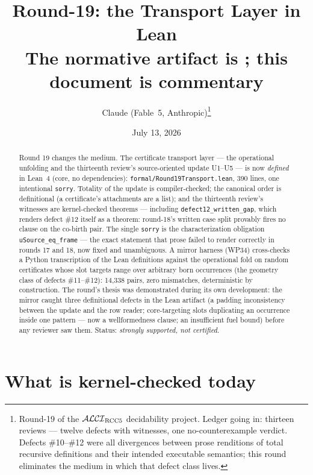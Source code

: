 \documentclass[11pt]{article}
\title{Round-19: the Transport Layer in Lean\\
\large The normative artifact is \code{formal/Round19Transport.lean};
this document is commentary}
\author{Claude (Fable~5, Anthropic)\thanks{Round-19 of the
$\mathcal{ALCI}_{\mathrm{RCC5}}$ decidability project.  Ledger going in: thirteen reviews ---
twelve defects with witnesses, one no-counterexample verdict.  Defects
\#10--\#12 were all divergences between prose renditions of total
recursive definitions and their intended executable semantics; this
round eliminates the medium in which that defect class lives.}}
\date{July 13, 2026}
\newcommand{\code}[1]{\texttt{#1}}
\begin{document}
\maketitle

\begin{abstract}
\noindent
Round 19 changes the medium.  The certificate transport layer --- the
operational unfolding and the thirteenth review's source-oriented
update U1--U5 --- is now \emph{defined} in Lean~4 (core, no
dependencies): \code{formal/Round19Transport.lean}, 390 lines, one
intentional \code{sorry}.  Totality of the update is
compiler-checked; the canonical order is definitional (a certificate's
attachments are a list); and the thirteenth review's witnesses are
kernel-checked theorems --- including \code{defect12\_written\_gap},
which renders defect \#12 itself as a theorem: round-18's written
case split provably fires no clause on the co-birth pair.  The single
\code{sorry} is the characterization obligation
\code{uSource\_eq\_frame} --- the exact statement that prose failed to
render correctly in rounds 17 and 18, now fixed and unambiguous.  A
mirror harness (WP34) cross-checks a Python transcription of the Lean
definitions against the operational fold on random certificates whose
slot targets range over arbitrary born occurrences (the geometry class
of defects \#11--\#12): 14{,}338 pairs, zero mismatches, deterministic
by construction.  The round's thesis was demonstrated during its own
development: the mirror caught three definitional defects in the Lean
artifact (a padding inconsistency between the update and the row
reader; core-targeting slots duplicating an occurrence inside one
pattern --- now a wellformedness clause; an insufficient fuel bound)
before any reviewer saw them.  Status: \emph{strongly supported, not
certified}.
\end{abstract}

\section{What is kernel-checked today}
\end{document}

